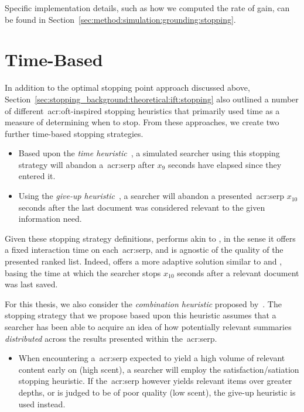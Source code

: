 Specific implementation details, such as how we computed the rate of gain, can be found in Section~\ref{sec:method:simulation:grounding:stopping}.

\section{Time-Based}\label{sec:strategies:time}
In addition to the optimal stopping point approach discussed above, Section~\ref{sec:stopping_background:theoretical:ift:stopping} also outlined a number of different~\gls{acr:oft}-inspired stopping heuristics that primarily used time as a measure of determining when to stop. From these approaches, we create two further time-based stopping strategies.

\begin{itemize}
    \item{ Based upon the \emph{time heuristic}~\citep{charles1972behaviour, krebs1973time_rule}, a simulated searcher using this stopping strategy will abandon a~\gls{acr:serp} after $x_9$ seconds have elapsed since they entered it.}
    
    \item{ Using the \emph{give-up heuristic}~\citep{krebs1974leave_after_rule}, a searcher will abandon a presented~\gls{acr:serp} $x_{10}$ seconds after the last document was considered relevant to the given information need.}
\end{itemize}

Given these stopping strategy definitions,  performs akin to , in the sense it offers a fixed interaction time on each~\gls{acr:serp}, and is agnostic of the quality of the presented ranked list. Indeed,  offers a more adaptive solution similar to  and , basing the time at which the searcher stops $x_{10}$ seconds after a relevant document was last saved.

For this thesis, we also consider the \emph{combination heuristic} proposed by~\cite{mcnair1982gut_mvt}. The stopping strategy that we propose based upon this heuristic assumes that a searcher has been able to acquire an idea of how potentially relevant summaries \emph{distributed} across the results presented within the~\gls{acr:serp}.

\begin{itemize}
    \item{ When encountering a~\gls{acr:serp} expected to yield a high volume of relevant content early on (high scent), a searcher will employ the satisfaction/satiation stopping heuristic. If the~\gls{acr:serp} however yields relevant items over greater depths, or is judged to be of poor quality (low scent), the give-up heuristic is used instead.}
\end{itemize}

